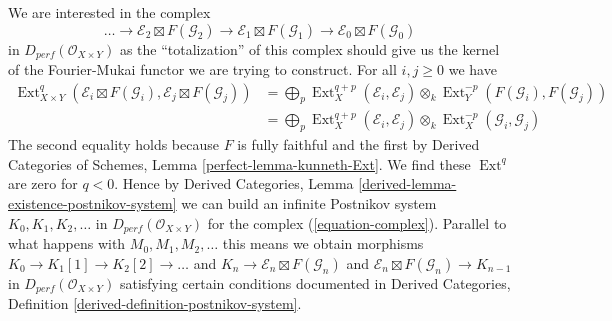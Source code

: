 \documentclass{stacks-project}
\theoremstyle{plain}
\theoremstyle{definition}
\theoremstyle{remark}
\numberwithin{equation}{subsection}
\def\Ext{\mathop{\mathrm{Ext}}\nolimits}
\begin{document}
\medskip\noindent
We are interested in the complex
\begin{equation}
\label{equation-complex}
\ldots \to
\mathcal{E}_2 \boxtimes F(\mathcal{G}_2) \to
\mathcal{E}_1 \boxtimes F(\mathcal{G}_1) \to
\mathcal{E}_0 \boxtimes F(\mathcal{G}_0)
\end{equation}
in $D_{perf}(\mathcal{O}_{X \times Y})$
as the ``totalization'' of this complex should
give us the kernel of the Fourier-Mukai functor we are trying to construct.
For all $i, j \geq 0$ we have
\begin{align*}
\Ext^q_{X \times Y}(\mathcal{E}_i \boxtimes F(\mathcal{G}_i),
\mathcal{E}_j \boxtimes F(\mathcal{G}_j))
& =
\bigoplus\nolimits_p
\Ext^{q + p}_X(\mathcal{E}_i, \mathcal{E}_j) \otimes_k
\Ext^{-p}_Y(F(\mathcal{G}_i), F(\mathcal{G}_j)) \\
& =
\bigoplus\nolimits_p
\Ext^{q + p}_X(\mathcal{E}_i, \mathcal{E}_j) \otimes_k
\Ext^{-p}_X(\mathcal{G}_i, \mathcal{G}_j)
\end{align*}
The second equality holds because $F$ is
fully faithful and the first by
Derived Categories of Schemes, Lemma \ref{perfect-lemma-kunneth-Ext}.
We find these $\Ext^q$ are zero for $q < 0$.
Hence by
Derived Categories, Lemma \ref{derived-lemma-existence-postnikov-system}
we can build an infinite Postnikov system $K_0, K_1, K_2, \ldots$
in $D_{perf}(\mathcal{O}_{X \times Y})$ for the complex
(\ref{equation-complex}).
Parallel to what happens with $M_0, M_1, M_2, \ldots$ this means we
obtain morphisms
$K_0 \to K_1[1] \to K_2[2] \to \ldots$ and
$K_n \to \mathcal{E}_n \boxtimes F(\mathcal{G}_n)$ and
$\mathcal{E}_n \boxtimes F(\mathcal{G}_n) \to K_{n - 1}$
in $D_{perf}(\mathcal{O}_{X \times Y})$
satisfying certain conditions documented in
Derived Categories, Definition \ref{derived-definition-postnikov-system}.
\end{document}
